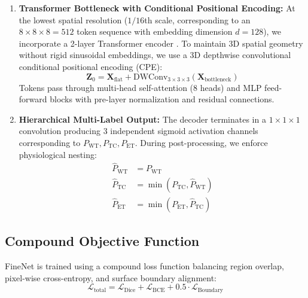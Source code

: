 \documentclass[12pt, a4paper]{article}
\begin{document}
\begin{enumerate}[leftmargin=*, itemsep=4pt]
    \begin{equation}
        \mathbf{Y}_{\text{dilated}} = \text{Conv}_{1\times 1\times 1}\left(\sum_{r \in \{1, 2, 4\}} \text{Conv}_{3\times 3\times 3}^{(r)}(\mathbf{X}; \mathbf{W})\right)
    \end{equation}
    This expands the effective receptive field from 7 to 25 voxels along each spatial axis without introducing additional parameters.
    \item \textbf{Transformer Bottleneck with Conditional Positional Encoding:} At the lowest spatial resolution ($1/16$th scale, corresponding to an $8 \times 8 \times 8 = 512$ token sequence with embedding dimension $d=128$), we incorporate a 2-layer Transformer encoder \cite{zhang2024augtransunet}. To maintain 3D spatial geometry without rigid sinusoidal embeddings, we use a 3D depthwise convolutional conditional positional encoding (CPE):
    \begin{equation}
        \mathbf{Z}_0 = \mathbf{X}_{\text{flat}} + \text{DWConv}_{3\times 3\times 3}(\mathbf{X}_{\text{bottleneck}})
    \end{equation}
    Tokens pass through multi-head self-attention (8 heads) and MLP feed-forward blocks with pre-layer normalization and residual connections.
    \item \textbf{Hierarchical Multi-Label Output:} The decoder terminates in a $1 \times 1 \times 1$ convolution producing 3 independent sigmoid activation channels corresponding to $P_{\text{WT}}, P_{\text{TC}}, P_{\text{ET}}$. During post-processing, we enforce physiological nesting:
    \begin{align}
        \hat{P}_{\text{WT}} &= P_{\text{WT}} \\
        \hat{P}_{\text{TC}} &= \min(P_{\text{TC}}, \hat{P}_{\text{WT}}) \\
        \hat{P}_{\text{ET}} &= \min(P_{\text{ET}}, \hat{P}_{\text{TC}})
    \end{align}
\end{enumerate}

\subsection{Compound Objective Function}
FineNet is trained using a compound loss function balancing region overlap, pixel-wise cross-entropy, and surface boundary alignment:
\begin{equation}
    \mathcal{L}_{\text{total}} = \mathcal{L}_{\text{Dice}} + \mathcal{L}_{\text{BCE}} + 0.5 \cdot \mathcal{L}_{\text{Boundary}}
\end{equation}
\end{document}
